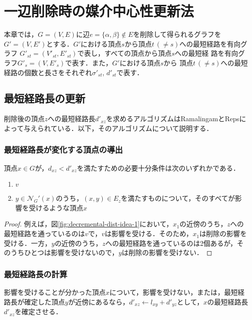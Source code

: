 \chapter{一辺削除時の媒介中心性更新法}
\label{chap:update-bc-on-delete}
本章では，$G=(V,E)$に辺$e=\{\alpha,\beta\} \not\in E$を削除して得られるグラフを
$G'=(V,E')$とする．$G'$における頂点$s$から頂点$t\,(\neq s)$への最短経路を有向グラフ
$G'_{st}=(V'_{st},E'_{st})$で表し，すべての頂点から頂点$s$への最短経
路を有向グラフ$G'_s=(V,E'_s)$で表す．また，$G'$における頂点$s$から
頂点$t\,(\neq s)$への最短経路の個数と長さをそれぞれ$\sigma'_{st}$, 
$d'_{st}$で表す．


\section{最短経路長の更新}
\label{sect:update-dist-on-insert}

削除後の頂点$z$への最短経路長$d'_{xz}$を求めるアルゴリズムはRamalingamとRepsによって与えられている．以下，そのアルゴリズムについて説明する．

\subsection{最短経路長が変化する頂点の導出}

\begin{lemma}
  頂点$x\in G$が，$d_{xz}<d'_{xz}$を満たすための必要十分条件は次のいずれかである．
  \begin{enumerate}
  \item $v$
  \item $y\in\mathcal{N}_G'(x)$のうち，$(x,y)\in E_z$を満たすものについて，そのすべてが影響を受けるような頂点$x$
  \end{enumerate}
\end{lemma}
\begin{proof}
例えば，図\ref{fig:decremental-dist-idea-1}において，$x_1$の近傍のうち，$z$への最短経路を通っているのは$v$で，$v$は影響を受ける．そのため，$x_1$は削除の影響を受ける．一方，$y$の近傍のうち，$z$への最短経路を通っているのは2個あるが，そのうちひとつは影響を受けないので，$y$は削除の影響を受けない．
\end{proof}

\subsection{最短経路長の計算}

\begin{lemma}
  影響を受けることが分かった頂点$x$について，影響を受けない，または，最短経路長が確定した頂点$y$が近傍にあるなら，$d'_{xz}\gets l_{xy}+d'_{yz}$として，$x$の最短経路長$d'_{xz}$を確定させる．
\end{lemma}

